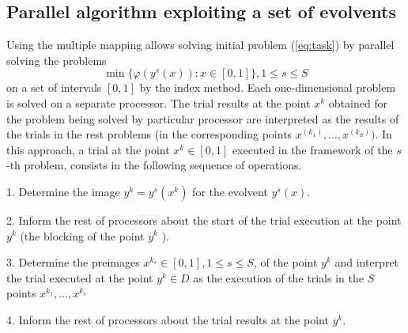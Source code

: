 \documentclass[runningheads]{llncs}
\begin{document}
\subsection{Parallel algorithm exploiting a set of evolvents}
\label{sec:parallel_evolvents}
Using the multiple mapping allows solving initial problem (\ref{eq:task}) by parallel solving the
problems
\[
\min\{\varphi(y^s(x)):x\in [0,1]\}, 1\leqslant s\leqslant S
\]
on a set of intervals $[0,1]$ by the index method. Each one-dimensional problem is solved on a
separate processor. The trial results at the point \(x^k\) obtained for the problem being solved by
particular processor are interpreted as the results of the trials in the rest problems (in the
corresponding points \(x^(k_1 ),\dots,x^(k_S))\). In this approach, a trial at the point \(x^k \in
[0,1]\) executed in the framework of the \(s\)-th problem, consists in the following sequence of
operations.
\par
1. Determine the image \(y^k=y^s (x^k)\) for the evolvent \(y^s (x)\).
\par
2. Inform the rest of processors about the start of the trial execution at the point\( y^k\) (the
blocking of the point \(y^k\) ).
\par
3. Determine the preimages \(x{}^{k_s}  \in [0,1], 1\leqslant s\leqslant S\), of the point \(y^k\) and interpret the
trial executed at the point \(y^k \in D \) as the execution of the trials in the \(S\) points
\(x{}^{k_1} ,\dots,x{}^{k_s} \)
\par
4. Inform the rest of processors about the trial results at the point \(y^k\).
\par
\end{document}
